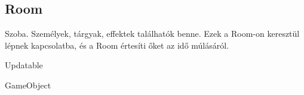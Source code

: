 \subsection{Room}
\begin{class-template-responsibility}
    Szoba. Személyek, tárgyak, effektek találhatók benne. Ezek a Room-on keresztül lépnek kapcsolatba, és a Room értesíti őket az idő múlásáról.
\end{class-template-responsibility}
\begin{class-template-interface}
    Updatable
\end{class-template-interface}
\begin{class-template-baseclass}
    GameObject
\end{class-template-baseclass}
\begin{class-template-attribute}
\end{class-template-attribute}
